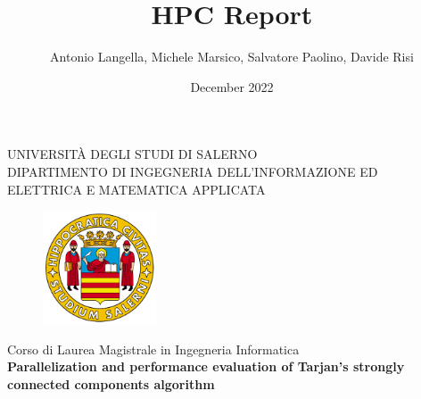 \documentclass[a4paper, 11pt, oneside]{book}
\title{HPC Report}
\author{Antonio Langella, Michele Marsico, Salvatore Paolino, Davide Risi}
\date{December 2022}
\begin{document}
\begin{titlepage}
    \begin{center}
        \LARGE{\uppercase{Università degli Studi di Salerno}}\\
        \vspace{5mm}
    	\uppercase{\normalsize DIPARTIMENTO DI INGEGNERIA DELL'INFORMAZIONE ED ELETTRICA E MATEMATICA APPLICATA }\\
    \end{center}
    \begin{figure}[H]
        \centering
        \includegraphics[width=0.3\textwidth]{img/logo_unisa}
    \end{figure}
    
    \begin{center}
    	\normalsize{ Corso di Laurea Magistrale in Ingegneria Informatica }\\
    	\vspace{10mm}
        {\LARGE{\bf Parallelization and performance evaluation of Tarjan's strongly connected components algorithm }}\\
    	\vspace{3mm}
    \end{center}
    

\end{titlepage}
\end{document}
